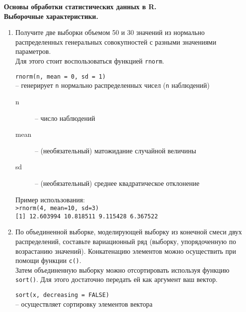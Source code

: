 \textbf{Основы обработки статистических данных в R. \\ \indent Выборочные характеристики.}
\begin{enumerate}
	\item Получите две выборки объемом 50 и 30 значений из нормально распределенных генеральных совокупностей с разными значениями параметров.\\
		Для этого стоит воспользоваться функцией \texttt{rnorm}.

		\begin{mdframed}[style=BadassFrame]

              \texttt{rnorm(n, mean = 0, sd = 1)} \\
              	-- генерирует \texttt{n} нормально распределенных чисел (\texttt{n} наблюдений)

              \begin{description}

                \item[n] -- число наблюдений
                \item[mean] -- (необязательный) матожидание случайной величины
                \item[sd] -- (необязательный) среднее квадратическое отклонение
              \end{description}
        \end{mdframed}

		Пример использования:\\
		\texttt{>rnorm(4, mean=10, sd=3)}\\
		\texttt{[1] 12.603994 10.818511  9.115428  6.367522}

	\item По объединенной выборке, моделирующей выборку из конечной смеси двух распределений, 
		составьте вариационный ряд (выборку, упорядоченную по возрастанию значений).
		Конкатенацию элементов можно осуществить при помощи функции \texttt{c()}. \\
		Затем объединенную выборку можно отсортировать используя функцию \texttt{sort()}. 
		Для этого достаточно передать ей как аргумент ваш вектор. 

		\begin{mdframed}[style=BadassFrame]

              \texttt{sort(x, decreasing = FALSE)} \\
              	-- осуществляет сортировку элементов вектора
              \begin{description}


\end{description}
\end{mdframed}
\end{enumerate}
